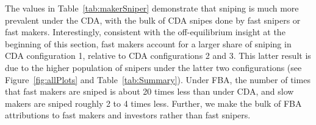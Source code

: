 \documentclass[12pt]{article}
\begin{document}
\begin{appendices}
\begin{table}[ht]
\vspace{.1in}
\begin{center}
\end{center}
\caption{Frequency counts of snipes under each of the CDA and FBA configurations, decomposed by the role of the sniper and the trader being sniped.}
\label{tab:makerSniper}
\end{table}

The values in Table~\ref{tab:makerSniper} demonstrate that sniping is much more prevalent under the CDA, with the bulk of CDA snipes done by fast snipers or fast makers.  Interestingly, consistent with the off-equilibrium insight at the beginning of this section, fast makers account for a larger share of sniping in CDA configuration 1, relative to CDA configurations 2 and 3. This latter result is due to the higher population of snipers under the latter two configurations (see Figure~\ref{fig:allPlots} and Table~\ref{tab:Summary}). 
Under FBA, the number of times that fast makers are sniped is about 20 times less than under CDA, and slow makers are sniped roughly 2 to 4 times less. Further, we make the bulk of FBA attributions to fast makers and investors rather than fast snipers.


\end{appendices}
\end{document}
